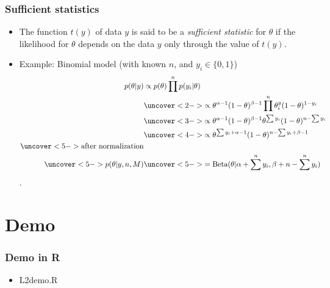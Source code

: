 \documentclass[10pt]{beamer}
\begin{document}
\begin{frame}
  \frametitle{Sufficient statistics}

\begin{itemize}
  \item The function $t(y)$ of data $y$ is said to be a {\em sufficient statistic} for $\theta$ if the likelihood for $\theta$ depends on the
data $y$ only through the value of $t(y)$.
  \item Example: Binomial model (with known $n$, and $y_i \in \{0,1\}$)
  \begin{align*}
      p(\theta|y) & \propto p(\theta) \prod^n p(y_i | \theta) \\
      &\uncover<2->{ \propto \theta^{\alpha-1} (1-\theta)^{\beta-1} \prod^n\theta^y_i (1-\theta)^{1-y_i}} \\
      &\uncover<3->{ \propto \theta^{\alpha-1} (1-\theta)^{\beta-1} \theta^{\sum y_i} (1-\theta)^{n - \sum y_i}} \\
      &\uncover<4->{ \propto
        \theta^{\sum y_i+\alpha-1} (1-\theta)^{n-\sum y_i+\beta-1}}\\
      \uncover<5->{\text{after normalization}} &\\
      \uncover<5->{p(\theta|y,n,M)}
      &\uncover<5->{ = \text{Beta}(\theta|\alpha+\sum^n y_i,\beta+n-\sum^n y_i)}
  \end{align*}
  .
\end{itemize}

\end{frame}

\section{Demo}

\begin{frame}
  \frametitle{Demo in R}

  \begin{itemize}
  \item L2demo.R
  \end{itemize}

\end{frame}
\end{document}
